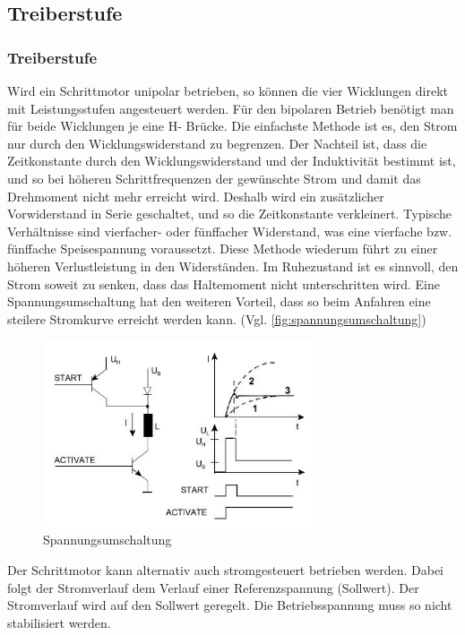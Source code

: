     \ifSTANDALONE
    \subsection{Treiberstufe}
    \fi
    \ifEMBED
    \subsubsection{Treiberstufe}
    \fi 
    	Wird ein Schrittmotor unipolar betrieben, so können die vier Wicklungen direkt mit Leistungsstufen angesteuert werden. Für den bipolaren Betrieb benötigt man für beide Wicklungen je eine H- Brücke. Die einfachste Methode ist es, den Strom nur durch den Wicklungswiderstand zu begrenzen. Der Nachteil ist, dass die Zeitkonstante durch den Wicklungswiderstand und der Induktivität bestimmt ist, und so bei höheren Schrittfrequenzen der gewünschte Strom und damit das Drehmoment nicht mehr erreicht wird. Deshalb wird ein zusätzlicher Vorwiderstand in Serie geschaltet, und so die Zeitkonstante verkleinert. Typische Verhältnisse sind vierfacher- oder fünffacher Widerstand, was eine vierfache bzw. fünffache Speisespannung voraussetzt. Diese Methode wiederum führt zu einer höheren Verlustleistung in den Widerständen. Im Ruhezustand ist es sinnvoll, den Strom soweit zu senken, dass das Haltemoment nicht unterschritten wird. Eine Spannungsumschaltung hat den weiteren Vorteil, dass so beim Anfahren eine steilere Stromkurve erreicht werden kann. (Vgl. \autoref{fig:spannungsumschaltung})
    	 \begin{figure}
    	 	\centering
    	 	\includegraphics[width=8cm]{src/Bilder/spannungsumschaltung.JPG}
    	 	\caption{Spannungsumschaltung}
    	 	\label{fig:spannungsumschaltung}
    	 \end{figure}
    	Der Schrittmotor kann alternativ auch stromgesteuert betrieben werden. Dabei folgt der Stromverlauf dem Verlauf einer Referenzspannung (Sollwert). Der Stromverlauf wird auf den Sollwert geregelt. Die Betriebsspannung muss so nicht stabilisiert werden. \label{stromgesteuert} 
	
	
		